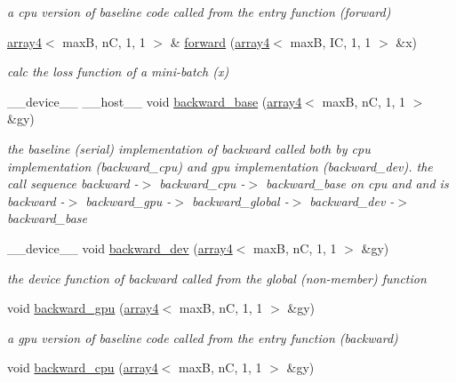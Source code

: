 \begin{DoxyCompactItemize}
\begin{DoxyCompactList}\small\item\em a cpu version of baseline code called from the entry function (forward) \end{DoxyCompactList}\item 
\hyperlink{structarray4}{array4}$<$ maxB, nC, 1, 1 $>$ \& \hyperlink{structLinear_aed0294f2d1c2013f66d89a52474352e5}{forward} (\hyperlink{structarray4}{array4}$<$ maxB, IC, 1, 1 $>$ \&x)
\begin{DoxyCompactList}\small\item\em calc the loss function of a mini-\/batch (x) \end{DoxyCompactList}\item 
\+\_\+\+\_\+device\+\_\+\+\_\+ \+\_\+\+\_\+host\+\_\+\+\_\+ void \hyperlink{structLinear_adcabfb5486aad2c05dd94bae98acf168}{backward\+\_\+base} (\hyperlink{structarray4}{array4}$<$ maxB, nC, 1, 1 $>$ \&gy)
\begin{DoxyCompactList}\small\item\em the baseline (serial) implementation of backward called both by cpu implementation (backward\+\_\+cpu) and gpu implementation (backward\+\_\+dev). the call sequence backward -\/$>$ backward\+\_\+cpu -\/$>$ backward\+\_\+base on cpu and and is backward -\/$>$ backward\+\_\+gpu -\/$>$ backward\+\_\+global -\/$>$ backward\+\_\+dev -\/$>$ backward\+\_\+base \end{DoxyCompactList}\item 
\+\_\+\+\_\+device\+\_\+\+\_\+ void \hyperlink{structLinear_a865f8dedc402675cd5cf240fcfbcd258}{backward\+\_\+dev} (\hyperlink{structarray4}{array4}$<$ maxB, nC, 1, 1 $>$ \&gy)
\begin{DoxyCompactList}\small\item\em the device function of backward called from the global (non-\/member) function \end{DoxyCompactList}\item 
void \hyperlink{structLinear_acc4936542d24da1357c1c7fb7f95d6ea}{backward\+\_\+gpu} (\hyperlink{structarray4}{array4}$<$ maxB, nC, 1, 1 $>$ \&gy)
\begin{DoxyCompactList}\small\item\em a gpu version of baseline code called from the entry function (backward) \end{DoxyCompactList}\item 
void \hyperlink{structLinear_acd4bd03ccec0da8849c2536d32770a61}{backward\+\_\+cpu} (\hyperlink{structarray4}{array4}$<$ maxB, nC, 1, 1 $>$ \&gy)

\end{DoxyCompactItemize}
